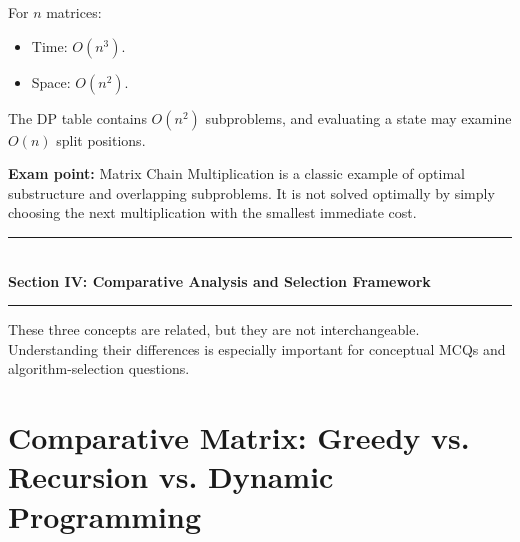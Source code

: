 For $n$ matrices:

\begin{itemize}
    \item Time: $O(n^3)$.
    \item Space: $O(n^2)$.
\end{itemize}

The DP table contains $O(n^2)$ subproblems, and evaluating a state may examine $O(n)$ split positions.

\textbf{Exam point:} Matrix Chain Multiplication is a classic example of optimal substructure and overlapping subproblems. It is not solved optimally by simply choosing the next multiplication with the smallest immediate cost.


\newpage
\begin{center}
\vspace{0.5em}
{\color{primary}\rule{0.45\textwidth}{1.2pt}}\\[4pt]
{\Large\bfseries\color{primary} Section IV: Comparative Analysis and Selection Framework}\\[2pt]
{\color{primary}\rule{0.45\textwidth}{1.2pt}}
\vspace{0.5em}
\end{center}


These three concepts are related, but they are not interchangeable. Understanding their differences is especially important for conceptual MCQs and algorithm-selection questions.

\section{Comparative Matrix: Greedy vs. Recursion vs. Dynamic Programming}

